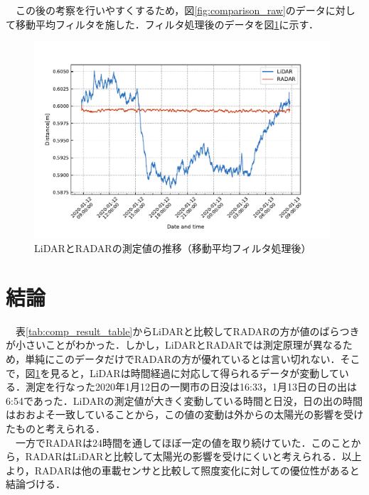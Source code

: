 　この後の考察を行いやすくするため，図\ref{fig:comparison_raw}のデータに対して移動平均フィルタを施した．フィルタ処理後のデータを図\ref{fig:comparison_filtered60}に示す．
\begin{figure}[H]
    \centering
    \includegraphics[width=11cm]{./fig/comparison_filtered60.pdf}
    \caption{LiDARとRADARの測定値の推移（移動平均フィルタ処理後）}
    \label{fig:comparison_filtered60}
\end{figure}

\section{結論}
　表\ref{tab:comp_result_table}からLiDARと比較してRADARの方が値のばらつきが小さいことがわかった．しかし，LiDARとRADARでは測定原理が異なるため，単純にこのデータだけでRADARの方が優れているとは言い切れない．そこで，図\ref{fig:comparison_filtered60}を見ると，LiDARは時間経過に対応して得られるデータが変動している．測定を行なった2020年1月12日の一関市の日没は16:33，1月13日の日の出は6:54であった．LiDARの測定値が大きく変動している時間と日没，日の出の時間はおおよそ一致していることから，この値の変動は外からの太陽光の影響を受けたものと考えられる．\\
　一方でRADARは24時間を通してほぼ一定の値を取り続けていた．このことから，RADARはLiDARと比較して太陽光の影響を受けにくいと考えられる．以上より，RADARは他の車載センサと比較して照度変化に対しての優位性があると結論づける．

